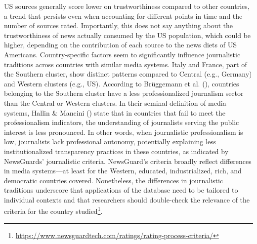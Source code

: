 \documentclass[12pt,twoside]{article}
\begin{document}
US sources generally score lower on trustworthiness compared to other countries, a trend that persists even when accounting for different points in time and the number of sources rated. 
Importantly, this does not say anything about the trustworthiness of news actually consumed by the US population, which could be higher, depending on the contribution of each source to the news diets of US Americans.
Country-specific factors seem to significantly influence journalistic traditions across countries with similar media systems.
Italy and France, part of the Southern cluster, show distinct patterns compared to Central (e.g., Germany) and Western clusters (e.g., US).
According to Brüggemann et al. (\citeyear{bruggemannHallinManciniRevisited2014b}), countries belonging to the Southern cluster have a less professionalized journalism sector than the Central or Western clusters.
In their seminal definition of media systems, Hallin \& Mancini (\citeyear{hallinComparingMediaSystems2004}) state that in countries that fail to meet the professionalism indicators, the understanding of journalists serving the public interest is less pronounced. 
In other words, when journalistic professionalism is low, journalists lack professional autonomy, potentially explaining less institutionalized transparency practices in these countries, as indicated by NewsGuards' journalistic criteria. 
NewsGuard's criteria broadly reflect differences in media systems––at least for the Western, educated, industrialized, rich, and democratic countries covered.
Nonetheless, the differences in journalistic traditions underscore that applications of the database need to be tailored to individual contexts and that researchers should double-check the relevance of the criteria for the country studied\footnote{\href{https://web.archive.org/web/20231230155214/https://www.newsguardtech.com/ratings/rating-process-criteria/}{https://www.newsguardtech.com/ratings/rating-process-criteria/}}.
\end{document}
